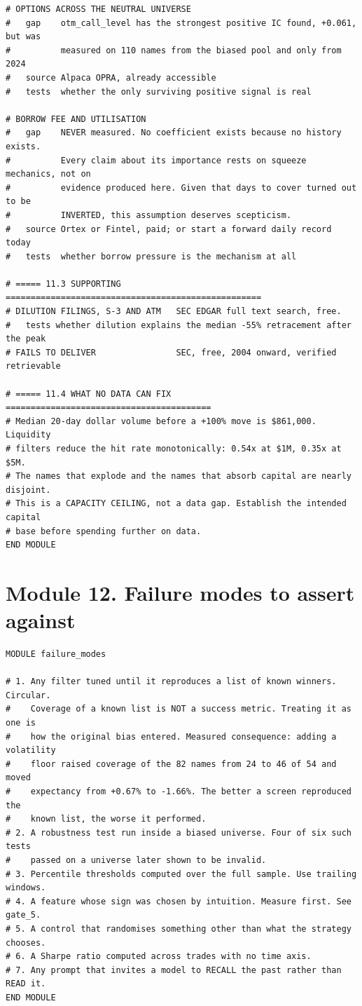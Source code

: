 \documentclass[10pt]{article}
\begin{document}
\begin{lstlisting}
# OPTIONS ACROSS THE NEUTRAL UNIVERSE
#   gap    otm_call_level has the strongest positive IC found, +0.061, but was
#          measured on 110 names from the biased pool and only from 2024
#   source Alpaca OPRA, already accessible
#   tests  whether the only surviving positive signal is real

# BORROW FEE AND UTILISATION
#   gap    NEVER measured. No coefficient exists because no history exists.
#          Every claim about its importance rests on squeeze mechanics, not on
#          evidence produced here. Given that days to cover turned out to be
#          INVERTED, this assumption deserves scepticism.
#   source Ortex or Fintel, paid; or start a forward daily record today
#   tests  whether borrow pressure is the mechanism at all

# ===== 11.3 SUPPORTING ===================================================
# DILUTION FILINGS, S-3 AND ATM   SEC EDGAR full text search, free.
#   tests whether dilution explains the median -55% retracement after the peak
# FAILS TO DELIVER                SEC, free, 2004 onward, verified retrievable

# ===== 11.4 WHAT NO DATA CAN FIX =========================================
# Median 20-day dollar volume before a +100% move is $861,000. Liquidity
# filters reduce the hit rate monotonically: 0.54x at $1M, 0.35x at $5M.
# The names that explode and the names that absorb capital are nearly disjoint.
# This is a CAPACITY CEILING, not a data gap. Establish the intended capital
# base before spending further on data.
END MODULE
\end{lstlisting}

\section{Module 12. Failure modes to assert against}

\begin{lstlisting}
MODULE failure_modes

# 1. Any filter tuned until it reproduces a list of known winners. Circular.
#    Coverage of a known list is NOT a success metric. Treating it as one is
#    how the original bias entered. Measured consequence: adding a volatility
#    floor raised coverage of the 82 names from 24 to 46 of 54 and moved
#    expectancy from +0.67% to -1.66%. The better a screen reproduced the
#    known list, the worse it performed.
# 2. A robustness test run inside a biased universe. Four of six such tests
#    passed on a universe later shown to be invalid.
# 3. Percentile thresholds computed over the full sample. Use trailing windows.
# 4. A feature whose sign was chosen by intuition. Measure first. See gate_5.
# 5. A control that randomises something other than what the strategy chooses.
# 6. A Sharpe ratio computed across trades with no time axis.
# 7. Any prompt that invites a model to RECALL the past rather than READ it.
END MODULE
\end{lstlisting}
\end{document}
